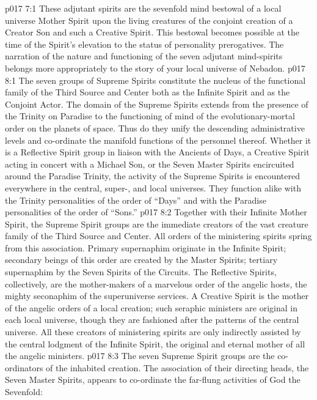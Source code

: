 \vs p017 7:1 These adjutant spirits are the sevenfold mind bestowal of a local universe Mother Spirit upon the living creatures of the conjoint creation of a Creator Son and such a Creative Spirit. This bestowal becomes possible at the time of the Spirit’s elevation to the status of personality prerogatives. The narration of the nature and functioning of the seven adjutant mind\hyp{}spirits belongs more appropriately to the story of your local universe of Nebadon.\plusone
{}
\vs p017 8:1 The seven groups of Supreme Spirits constitute the nucleus of the functional family of the Third Source and Center both as the Infinite Spirit and as the Conjoint Actor. The domain of the Supreme Spirits extends from the presence of the Trinity on Paradise to the functioning of mind of the evolutionary\hyp{}mortal order on the planets of space. Thus do they unify the descending administrative levels and co\hyp{}ordinate the manifold functions of the personnel thereof. Whether it is a Reflective Spirit group in liaison with the Ancients of Days, a Creative Spirit acting in concert with a Michael Son, or the Seven Master Spirits encircuited around the Paradise Trinity, the activity of the Supreme Spirits is encountered everywhere in the central, super-, and local universes. They function alike with the Trinity personalities of the order of “Days” and with the Paradise personalities of the order of “Sons.”
\pc \vs p017 8:2 Together with their Infinite Mother Spirit, the Supreme Spirit groups are the immediate creators of the vast creature family of the Third Source and Center. All orders of the ministering spirits spring from this association. Primary supernaphim originate in the Infinite Spirit; secondary beings of this order are created by the Master Spirits; tertiary supernaphim by the Seven Spirits of the Circuits. The Reflective Spirits, collectively, are the mother\hyp{}makers of a marvelous order of the angelic hosts, the mighty seconaphim of the superuniverse services. A Creative Spirit is the mother of the angelic orders of a local creation; such seraphic ministers are original in each local universe, though they are fashioned after the patterns of the central universe. All these creators of ministering spirits are only indirectly assisted by the central lodgment of the Infinite Spirit, the original and eternal mother of all the angelic ministers.
\pc \vs p017 8:3 The seven Supreme Spirit groups are the co\hyp{}ordinators of the inhabited creation. The association of their directing heads, the Seven Master Spirits, appears to co\hyp{}ordinate the far\hyp{}flung activities of God the Sevenfold:
